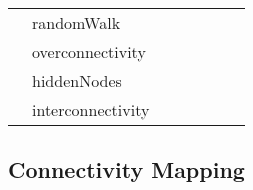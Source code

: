 \begin{table}[]
{\begin{tabular}{lllllll}
                                                                                             & randomWalk         &                                                                                   &                                                                             &                                                                                 &                                                                          & ~\cite{RN76}                  \\
                                                                                             & overconnectivity   &                                                                                   &                                                                             &                                                                                 &                                                                          & ~\cite{RN77}                  \\
                                                                                             & hiddenNodes        &                                                                                   &                                                                             &                                                                                 &                                                                          &                               \\
                                                                                             & interconnectivity  &                                                                                   &                                                                             &                                                                                 &                                                                          & ~\cite{RN78}                  \\ \hline
\end{tabular}%
}
\end{table}

\subsection{Connectivity Mapping} %
\label{sub:connectivitymapping}

